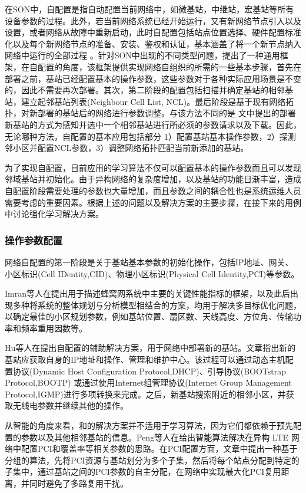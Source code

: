 \documentclass{IEEEtran}
\begin{document}
在SON中，自配置是指自动配置当前网络中，如微基站，中继站，宏基站等所有设备参数的过程。此外，若当前网络系统已经开始运行，又有新网络节点引入以及设置，或者网络从故障中重新启动，此时自配置包括站点位置选择、硬件配置标准化以及每个新网络节点的准备、安装、鉴权和认证，基本涵盖了将一个新节点纳入网络中运行的全部过程 \cite{Aliu2013}。针对SON中出现的不同类型问题，\cite{Wainio2016}提出了一种通用框架，在自配置的角度，该框架提供实现网络自组织的所需的一些基本步骤，首先在部署之前，基站已经配置基本的操作参数，这些参数对于各种实际应用场景是不变的，因此不需要再次部署。其次，第二阶段的配置包括扫描并确定基站的相邻基站，建立起邻基站列表(Neighbour Cell List, NCL)。最后阶段是基于现有网络拓扑，对新部署的基站后的网络进行参数调整。与该方法不同的是 \cite{Hu2010}文中提出的部署新基站的方式为感知并选中一个相邻基站进行所必须的参数请求以及下载。因此，无论哪种方法，自配置的基本应用包括部分 1）配置基站基本操作参数，2）探测邻小区并配置NCL参数，3）调整网络拓扑匹配当前新添加的基站。

为了实现自配置，目前应用的学习算法不仅可以配置基本的操作参数而且可以发现邻域基站并初始化。由于异构网络的复杂度增加，以及基站的功能日渐丰富，造成自配置阶段需要处理的参数也大量增加，而且参数之间的耦合性也是系统运维人员需要考虑的重要因素。根据上述的问题以及解决方案的主要步骤，在接下来的用例中讨论强化学习解决方案。

\subsubsection{操作参数配置}

网络自配置的第一阶段是关于基站基本参数的初始化操作，包括IP地址、网关、小区标识(Cell IDentity,CID)、物理小区标识(Physical Cell Identity,PCI)等参数。

Imran等人在\cite{Imran2013a}提出用于描述蜂窝网系统中主要的关键性能指标的框架，以及此后出现多种将系统的整体规划与分析模型相结合的方案，均用于解决多目标优化问题，以确定最佳的小区规划参数，例如基站位置、扇区数、天线高度、方位角、传输功率和频率重用因数等。

Hu等人在\cite{Hu2010}提出自配置的辅助解决方案，用于网络中部署新的基站。文章指出新的基站应获取自身的IP地址和操作、管理和维护中心。该过程可以通过动态主机配置协议(Dynamic Host Configuration Protocol,DHCP)、引导协议(BOOTstrap Protocol,BOOTP) 或通过使用Internet组管理协议(Internet Group Management Protocol,IGMP)进行多项转换来完成。之后，新基站搜索附近的相邻小区，并获取无线电参数并继续其他的操作。

从智能的角度来看，\cite{Wainio2016}和\cite{Hu2010}的解决方案并不适用于学习算法，因为它们都依赖于预先配置的参数以及其他相邻基站的信息。Peng等人在\cite{Peng2013}给出智能算法解决在异构 LTE 网络中配置PCI和覆盖率等相关参数的思路。在PCI配置方面，文章中提出一种基于分组的算法，先将PCI资源与基站划分为多个子集，然后将每个站点分配到特定的子集中，通过基站之间的PCI参数的自主分配，在网络中实现最大化PCI复用距离，并同时避免了多路复用干扰。
\end{document}
